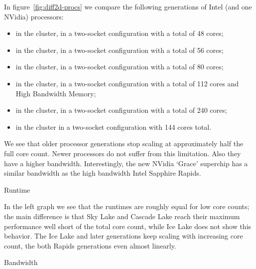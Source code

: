 In figure~\ref{fig:diff2d-procs} we compare the following generations of Intel
(and one NVidia) processors:
\begin{itemize}
\item {} in the  cluster,
  in a two-socket configuration with a total of 48 cores;
\item {} in the  cluster,
  in a two-socket configuration with a total of 56 cores;
\item {} in the  cluster,
  in a two-socket configuration with a total of 80 cores;
\item {} in the  cluster,
  in a two-socket configuration with a total of 112 cores and
  High Bandwidth Memory;
\item {} in the  cluster,
  in a two-socket configuration with a total of 240 cores;
\item {} in the  cluster
  in a two-socket configuration with 144 cores total.
\end{itemize}
We see that older processor generations stop scaling at approximately half the full core count.
Newer processors do not suffer from this limitation.
Also they have a higher bandwidth.
Interestingly, the new NVidia `Grace' superchip has a similar bandwidth
as the high bandwidth Intel Sapphire Rapids.

 {Runtime}

In the left graph we see that the runtimes are roughly equal for low core counts;
the main difference is that Sky Lake and Cascade Lake reach their maximum performance
well short of the total core count, while Ice Lake does not show this behavior.
The Ice Lake and later generations keep scaling with increasing core count,
the both Rapids generations even almost linearly.

 {Bandwidth}

